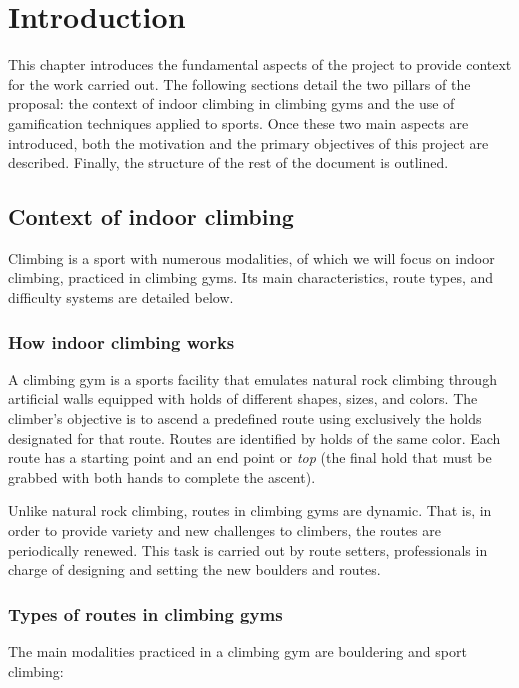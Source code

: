 \chapter{Introduction}
\label{cap:introduction}

This chapter introduces the fundamental aspects of the project to provide context for the work carried out. The following sections detail the two pillars of the proposal: the context of indoor climbing in climbing gyms and the use of gamification techniques applied to sports. Once these two main aspects are introduced, both the motivation and the primary objectives of this project are described. Finally, the structure of the rest of the document is outlined.

\section{Context of indoor climbing}

Climbing is a sport with numerous modalities, of which we will focus on indoor climbing, practiced in climbing gyms. Its main characteristics, route types, and difficulty systems are detailed below.

\subsection{How indoor climbing works}

A climbing gym is a sports facility that emulates natural rock climbing through artificial walls equipped with holds of different shapes, sizes, and colors. The climber's objective is to ascend a predefined route using exclusively the holds designated for that route. Routes are identified by holds of the same color. Each route has a starting point and an end point or \textit{top} (the final hold that must be grabbed with both hands to complete the ascent).

Unlike natural rock climbing, routes in climbing gyms are dynamic. That is, in order to provide variety and new challenges to climbers, the routes are periodically renewed. This task is carried out by route setters, professionals in charge of designing and setting the new boulders and routes.

\subsection{Types of routes in climbing gyms}

The main modalities practiced in a climbing gym are bouldering and sport climbing:

